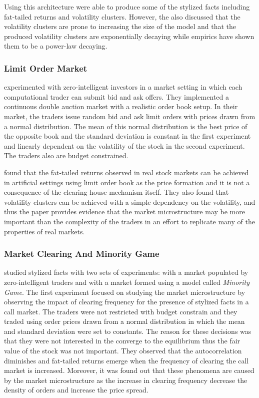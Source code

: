 Using this architecture \citet{Genoa01} were able to produce some of the stylized facts
including fat-tailed returns and volatility clusters. However, the also discussed
that the volatility clusters are prone to increasing the size of the model and
that the produced volatility clusters are exponentially decaying while empirics have
shown them to be a power-law decaying.

\subsubsection{Limit Order Market}
\citet{Raberto05} experimented with zero-intelligent investors in a market setting
in which each computational trader can submit bid and ask offers. They
implemented a continuous double auction market with a realistic order
book setup. In their market, the traders issue random bid and ask limit
orders with prices drawn from a normal distribution. The mean of this 
normal distribution is the best price of the opposite book and the 
standard deviation is constant in the first experiment and linearly 
dependent on the volatility of the stock in the second experiment. The
traders also are budget constrained. 

\citet{Raberto05} found that the fat-tailed returns observed in
real stock markets can be achieved in artificial settings using limit 
order book as the price formation and it is not a consequence of the clearing 
house mechanism itself. They also found that volatility clusters can
be achieved with a simple dependency on the volatility, and thus the paper
provides evidence that the market microstructure may be more
important than the complexity of the traders in an effort to replicate
many of the properties of real markets.

\subsubsection{Market Clearing And Minority Game}

\citet{LIU20082535} studied stylized facts with two sets of experiments: with
a market populated by zero-intelligent traders and with a market formed using 
a model called \textit{Minority Game}. The first experiment focused on studying
the market microstructure by observing the impact of clearing frequency for the 
presence of stylized facts in a call market. The traders were not restricted with budget 
constrain and they traded using order prices drawn from a normal distribution 
in which the mean and standard deviation were set to constants. The reason 
for these decisions was that they were not interested in the converge to 
the equilibrium thus the fair value of the stock was not important. They 
observed that the autocorrelation diminishes and fat-tailed returns emerge 
when the frequency of clearing the call market is increased. Moreover,
it was found out that these phenomena are caused by the market microstructure
as the increase in clearing frequency decrease the density of orders and 
increase the price spread. %

